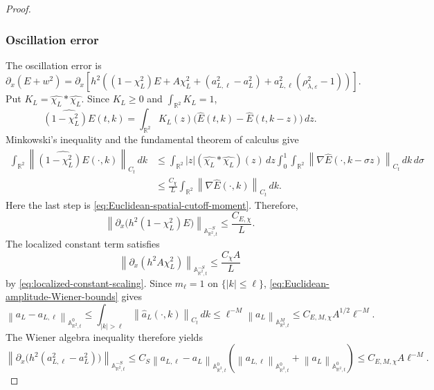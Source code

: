 \documentclass[10pt,a4paper]{amsart}
\newcommand{\A}{\mathbb A}
\newcommand{\R}{\mathbb R}
\newcommand{\abs}[1]{\left\lvert #1\right\rvert}
\newcommand{\eps}{\varepsilon}
\newcommand{\la}{\lambda}
\newcommand{\norm}[1]{\left\lVert #1\right\rVert}
\begin{document}
\begin{proof}
\subsubsection*{Oscillation error}

The oscillation error is
\[
 \partial_x(E+w^2)
 =\partial_x\left[h^2\left((1-\chi_L^2)E+A\chi_L^2
 +(a_{L,\ell}^2-a_L^2)
 +a_{L,\ell}^2(\rho_{\la,\eps}^2-1)\right)\right].
\]
Put
$K_L=\widehat{\chi_L}*\widehat{\chi_L}$.  Since
$K_L\geq0$ and $\int_{\R^2}K_L=1$,
\[
 \widehat{(1-\chi_L^2)E}(t,k)
 =\int_{\R^2}K_L(z)
   \bigl(\widehat E(t,k)-\widehat E(t,k-z)\bigr)\,dz.
\]
Minkowski's inequality and the fundamental theorem of calculus give
\begin{align*}
 \int_{\R^2}
 \norm{\widehat{(1-\chi_L^2)E}(\cdot,k)}_{C_t}\,dk
 &\leq\int_{\R^2}\abs z
 (\widehat{\chi_L}*\widehat{\chi_L})(z)\,dz
 \int_0^1\int_{\R^2}
 \norm{\nabla\widehat E(\cdot,k-\sigma z)}_{C_t}\,dk\,d\sigma\\
 &\leq\frac{C_\chi}{L}
 \int_{\R^2}\norm{\nabla\widehat E(\cdot,k)}_{C_t}\,dk.
\end{align*}
Here the last step is \eqref{eq:Euclidean-spatial-cutoff-moment}.
Therefore,
\begin{equation*}
 \norm{\partial_x\bigl(h^2(1-\chi_L^2)E\bigr)}
      _{\A^{-S}_{\R^2,t}}
 \leq\frac{C_{E,\chi}}{L}.
\end{equation*}
The localized constant term satisfies
\begin{equation*}
 \norm{\partial_x(h^2A\chi_L^2)}_{\A^{-S}_{\R^2,t}}
 \leq\frac{C_\chi A}{L}
\end{equation*}
by \eqref{eq:localized-constant-scaling}.  Since $m_\ell=1$ on
$\{\abs k\leq\ell\}$, \eqref{eq:Euclidean-amplitude-Wiener-bounds}
gives
\[
 \norm{a_L-a_{L,\ell}}_{\A^0_{\R^2,t}}
 \leq\int_{\abs k>\ell}\norm{\widehat a_L(\cdot,k)}_{C_t}\,dk
 \leq\ell^{-M}\norm{a_L}_{\A^M_{\R^2,t}}
 \leq C_{E,M,\chi}A^{1/2}\ell^{-M}.
\]
The Wiener algebra inequality therefore yields
\begin{equation*}
 \norm{\partial_x\bigl(h^2(a_{L,\ell}^2-a_L^2)\bigr)}
      _{\A^{-S}_{\R^2,t}}
 \leq C_S\norm{a_{L,\ell}-a_L}_{\A^0_{\R^2,t}}
 \left(\norm{a_{L,\ell}}_{\A^0_{\R^2,t}}
       +\norm{a_L}_{\A^0_{\R^2,t}}\right)
 \leq C_{E,M,\chi}A\ell^{-M}.
\end{equation*}


\end{proof}
\end{document}
